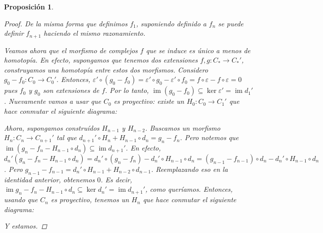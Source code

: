 \documentclass[12pt]{book}
\newtheorem{prop}[teo]{Proposición}
\theoremstyle{definition}
\DeclareMathOperator{\im}{im}
\begin{document}
\begin{prop}
\begin{proof}
De la misma forma que definimos $f_1$, suponiendo definido a $f_n$ se puede definir $f_{n+1}$ haciendo el mismo razonamiento.

Veamos ahora que el morfismo de complejos $f$ que se induce es único a menos de homotopía. En efecto, supongamos que tenemos dos extensiones $f,g:C_*\to C_*'$, construyamos una homotopía entre estos dos morfismos. Considero $g_0-f_0:C_0\to C_0'$. Entonces, $\varepsilon'\circ (g_0-f_0) = \varepsilon'\circ g_0 - \varepsilon'\circ f_0 = f\circ\varepsilon - f\circ \varepsilon = 0$ pues $f_0$ y $g_0$ son extensiones de $f$. Por lo tanto, $\im (g_0-f_0) \subseteq \ker \varepsilon' = \im d_1'$. Nuevamente vamos a usar que $C_0$ es proyectivo: existe un $H_0:C_0\to C_1'$ que hace conmutar el siguiente diagrama:

\begin{center}
\end{center}

Ahora, supongamos construídos $H_{n-1}$ y $H_{n-2}$. Buscamos un morfismo $H_n:C_n\to C_{n+1}'$ tal que $d_{n+1}'\circ H_n + H_{n-1}\circ d_n = g_n-f_n$. Pero notemos que $\im (g_n - f_n - H_{n-1}\circ d_n) \subseteq \im d_{n+1}'$. En efecto, $d_n'(g_n - f_n - H_{n-1}\circ d_n) = d_n'\circ (g_n-f_n) - d_n'\circ H_{n-1}\circ d_n = (g_{n-1}-f_{n-1})\circ d_n - d_n'\circ H_{n-1}\circ d_n$. Pero $g_{n-1} - f_{n-1} = d_n' \circ H_{n-1} + H_{n-2}\circ d_{n-1}$. Reemplazando eso en la identidad anterior, obtenemos $0$. Es decir, $\im g_n-f_n-H_{n-1}\circ d_n\subseteq \ker d_n'=\im d_{n+1}'$, como queríamos. Entonces, usando que $C_n$ es proyectivo, tenemos un $H_n$ que hace conmutar el siguiente diagrama:

\begin{center}
\end{center}
Y estamos.
\end{proof}
\end{prop}
\end{document}
